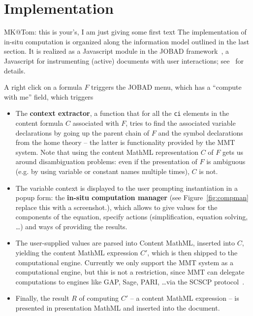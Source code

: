\section{Implementation}\label{sec:impl}
\begin{newpart}{MK@Tom: this is your's, I am just giving some first text}
  The implementation of in-situ computation is organized along the information model
  outlined in the last section. It is realized as a Javascript module in the JOBAD
  framework~\cite{JOBAD:on}, a Javascript for instrumenting (active) documents with user
  interactions; see~\cite{GLR:WebSvcActMathDoc09} for details.

  A right click on a formula $F$ triggers the JOBAD menu, which has a ``compute with me''
  field, which triggers
  \begin{itemize}
  \item The \textbf{context extractor}, a function that for all the \lstinline|ci|
    elements in the content formula $C$ associated with $F$, tries to find the associated
    variable declarations by going up the parent chain of $F$ and the symbol declarations
    from the home theory -- the latter is functionality provided by the MMT system. Note
    that using the content MathML representation $C$ of $F$ gets us around disambiguation
    problems: even if the presentation of $F$ is ambiguous (e.g. by using variable or
    constant names multiple times), $C$ is not.
  \item The variable context is displayed to the user prompting instantiation in a popup
    form: the \textbf{in-situ computation manager} (see Figure~\ref{fig:compman}\ednote
    {replace this with a screenshot.}), which allows to give values for the components of
    the equation, specify actions (simplification, equation solving, \ldots) and ways of
    providing the results.
  \item The user-supplied values are parsed into Content MathML, inserted into $C$,
    yielding the content MathML expression $C'$, which is then shipped to the
    computational engine. Currently we only support the MMT system as a computational
    engine, but this is not a restriction, since MMT can delegate computations to engines
    like GAP, Sage, PARI, \ldots via the SCSCP protocol~\cite{ODK-D3.3}. 
  \item Finally, the result $R$ of computing $C'$ -- a content MathML expression -- is
    presented in presentation MathML and inserted into the document. 
  \end{itemize}


\end{newpart}

